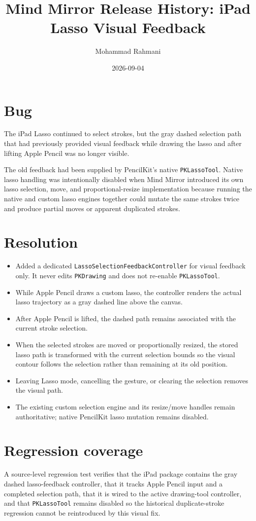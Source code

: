\documentclass[a4paper]{article}
\title{Mind Mirror Release History: iPad Lasso Visual Feedback}
\date{2026-09-04}
\author{Mohammad Rahmani}
\begin{document}
   \maketitle

   \section{Bug}
   The iPad Lasso continued to select strokes, but the gray dashed selection path
   that had previously provided visual feedback while drawing the lasso and after
   lifting Apple Pencil was no longer visible.

   The old feedback had been supplied by PencilKit's native \texttt{PKLassoTool}.
   Native lasso handling was intentionally disabled when Mind Mirror introduced
   its own lasso selection, move, and proportional-resize implementation because
   running the native and custom lasso engines together could mutate the same
   strokes twice and produce partial moves or apparent duplicated strokes.

   \section{Resolution}
   \begin{itemize}
      \item Added a dedicated \texttt{LassoSelectionFeedbackController} for visual
      feedback only. It never edits \texttt{PKDrawing} and does not re-enable
      \texttt{PKLassoTool}.
      \item While Apple Pencil draws a custom lasso, the controller renders the
      actual lasso trajectory as a gray dashed line above the canvas.
      \item After Apple Pencil is lifted, the dashed path remains associated with
      the current stroke selection.
      \item When the selected strokes are moved or proportionally resized, the
      stored lasso path is transformed with the current selection bounds so the
      visual contour follows the selection rather than remaining at its old
      position.
      \item Leaving Lasso mode, cancelling the gesture, or clearing the selection
      removes the visual path.
      \item The existing custom selection engine and its resize/move handles remain
      authoritative; native PencilKit lasso mutation remains disabled.
   \end{itemize}

   \section{Regression coverage}
   A source-level regression test verifies that the iPad package contains the
   gray dashed lasso-feedback controller, that it tracks Apple Pencil input and a
   completed selection path, that it is wired to the active drawing-tool
   controller, and that \texttt{PKLassoTool} remains disabled so the historical
   duplicate-stroke regression cannot be reintroduced by this visual fix.

   
   
\end{document}
